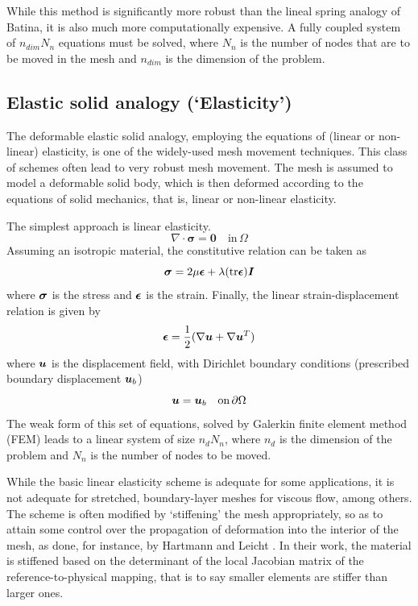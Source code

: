  While this method is significantly more robust than the lineal spring analogy of Batina, it is also much more computationally expensive. A fully coupled system of $n_{dim} N_n$ equations must be solved, where $N_n$ is the number of nodes that are to be moved in the mesh and $n_{dim}$ is the dimension of the problem.
 
 \subsection{Elastic solid analogy (`Elasticity')}
 
 The deformable elastic solid analogy, employing the equations of (linear or non-linear) elasticity, is one of the widely-used mesh movement techniques. This class of schemes often lead to very robust mesh movement. The mesh is assumed to model a deformable solid body, which is then deformed according to the equations of solid mechanics, that is, linear or non-linear elasticity.
 
 The simplest approach is linear elasticity.
 \begin{equation}
 \nabla \cdot \mathbf{\sigma}  = \mathbf{0} \quad \text{in} \, \Omega
 \end{equation}
 Assuming an isotropic material, the constitutive relation can be taken as
 \begin{equation}
 \boldsymbol{\sigma} = 2\mu\boldsymbol{\epsilon} + \lambda (\mathrm{tr}\boldsymbol{\epsilon}) \boldsymbol{I}
 \label{linelast:constt}
 \end{equation}
 where $\boldsymbol{\sigma}$ is the stress and $\boldsymbol{\epsilon}$ is the strain.
 Finally, the linear strain-displacement relation is given by
 \begin{equation}
 \boldsymbol{\epsilon} = \frac12 (\nabla\boldsymbol{u}+\nabla\boldsymbol{u}^T)
 \label{linelast:strain}
 \end{equation}
 where $\boldsymbol{u}$ is the displacement field, with Dirichlet boundary conditions (prescribed boundary displacement $\boldsymbol{u}_b$)
 \begin{equation}
 \boldsymbol{u} = \boldsymbol{u}_b \quad \text{on} \, \partial\Omega
 \end{equation}
 The weak form of this set of equations, solved by Galerkin finite element method (FEM) leads to a linear system of size $n_d N_n$, where $n_d$ is the dimension of the problem and $N_n$ is the number of nodes to be moved.
 
 While the basic linear elasticity scheme is adequate for some applications, it is not adequate for stretched, boundary-layer meshes for viscous flow, among others. The scheme is often modified by `stiffening' the mesh appropriately, so as to attain some control over the propagation of deformation into the interior of the mesh, as done, for instance, by Hartmann and Leicht \cite{curve:hartmann}. In their work, the material is stiffened based on the determinant of the local Jacobian matrix of the reference-to-physical mapping, that is to say smaller elements are stiffer than larger ones.
 
